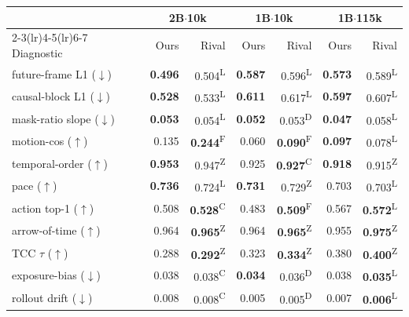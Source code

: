 \documentclass[letterpaper]{article} %
\begin{document}
\begin{table}[!t]
\centering
\small
\setlength{\tabcolsep}{2pt}
\begin{tabular}{lrrrrrr}
\toprule
 & \multicolumn{2}{c}{2B$\cdot$10k} & \multicolumn{2}{c}{1B$\cdot$10k} & \multicolumn{2}{c}{1B$\cdot$115k} \\
\cmidrule(lr){2-3}\cmidrule(lr){4-5}\cmidrule(lr){6-7}
Diagnostic & Ours & Rival & Ours & Rival & Ours & Rival \\
\midrule
future-frame L1 ($\downarrow$) & \textbf{0.496} & 0.504\textsuperscript{L} & \textbf{0.587} & 0.596\textsuperscript{L} & \textbf{0.573} & 0.589\textsuperscript{L} \\
causal-block L1 ($\downarrow$) & \textbf{0.528} & 0.533\textsuperscript{L} & \textbf{0.611} & 0.617\textsuperscript{L} & \textbf{0.597} & 0.607\textsuperscript{L} \\
mask-ratio slope ($\downarrow$) & \textbf{0.053} & 0.054\textsuperscript{L} & \textbf{0.052} & 0.053\textsuperscript{D} & \textbf{0.047} & 0.058\textsuperscript{L} \\
motion-cos ($\uparrow$) & 0.135 & \textbf{0.244}\textsuperscript{F} & 0.060 & \textbf{0.090}\textsuperscript{F} & \textbf{0.097} & 0.078\textsuperscript{L} \\
\midrule
temporal-order ($\uparrow$) & \textbf{0.953} & 0.947\textsuperscript{Z} & 0.925 & \textbf{0.927}\textsuperscript{C} & \textbf{0.918} & 0.915\textsuperscript{Z} \\
pace ($\uparrow$) & \textbf{0.736} & 0.724\textsuperscript{L} & \textbf{0.731} & 0.729\textsuperscript{Z} & 0.703 & 0.703\textsuperscript{L} \\
action top-1 ($\uparrow$) & 0.508 & \textbf{0.528}\textsuperscript{C} & 0.483 & \textbf{0.509}\textsuperscript{F} & 0.567 & \textbf{0.572}\textsuperscript{L} \\
arrow-of-time ($\uparrow$) & 0.964 & \textbf{0.965}\textsuperscript{Z} & 0.964 & \textbf{0.965}\textsuperscript{Z} & 0.955 & \textbf{0.975}\textsuperscript{Z} \\
TCC $\tau$ ($\uparrow$) & 0.288 & \textbf{0.292}\textsuperscript{Z} & 0.323 & \textbf{0.334}\textsuperscript{Z} & 0.380 & \textbf{0.400}\textsuperscript{Z} \\
exposure-bias ($\downarrow$) & 0.038 & 0.038\textsuperscript{C} & \textbf{0.034} & 0.036\textsuperscript{D} & 0.038 & \textbf{0.035}\textsuperscript{L} \\
rollout drift ($\downarrow$) & 0.008 & 0.008\textsuperscript{C} & 0.005 & 0.005\textsuperscript{D} & 0.007 & \textbf{0.006}\textsuperscript{L} \\

\end{tabular}
\end{table}
\end{document}

